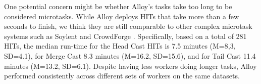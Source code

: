 %
%




One potential concern might be whether Alloy's tasks take too long to be considered microtasks. 
While Alloy deploys HITs that take more than a few
seconds to finish, we think they are still comparable to other complex microtask systems
such as Soylent \cite{bernstein2010soylent} and CrowdForge \cite{kittur2011crowdforge}.
Specifically, based on a total of 281 HITs, the median run-time
for the Head Cast HITs is 7.5 minutes (M=8,3, SD=4.1), for
Merge Cast 8.3 minutes (M=16.2, SD=15.6), and for Tail Cast
11.4 minutes (M=13.2, SD=6.1). 
Despite having less workers
doing longer tasks, Alloy performed consistently
across different sets of workers on the same datasets.


